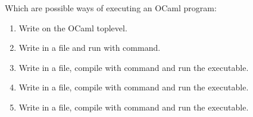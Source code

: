 \question Which are possible ways of executing an OCaml program:
\begin{enumerate}
\item Write on the OCaml toplevel.
\item Write in a file and run with \lstinline@ocaml@ command.
\item Write in a file, compile with \lstinline@ocamlc@ command and run the executable.
\item Write in a file, compile with \lstinline@ocamlopt@ command and run the executable.
\item Write in a file, compile with \lstinline@ocamlcom@ command and run the executable.
\end{enumerate}